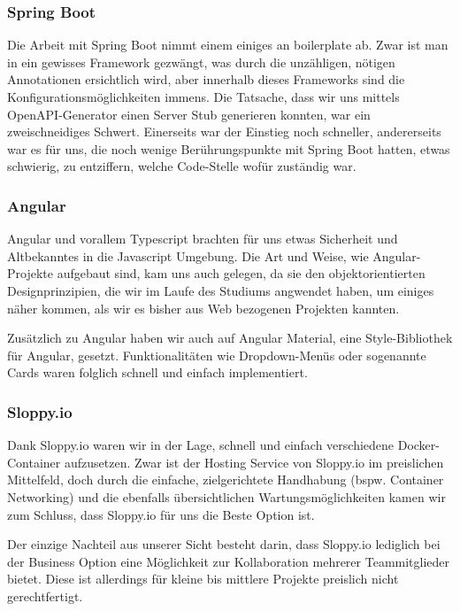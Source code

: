 \documentclass[../main.tex]{subfiles}
\begin{document}
	\subsubsection{Spring Boot}
	Die Arbeit mit Spring Boot nimmt einem einiges an \gls{boilerplate} ab. Zwar ist man in ein gewisses Framework gezwängt, was durch die unzähligen, nötigen Annotationen ersichtlich wird, aber innerhalb dieses Frameworks sind die Konfigurationsmöglichkeiten immens. Die Tatsache, dass wir uns mittels OpenAPI-Generator einen Server Stub generieren konnten, war ein zweischneidiges Schwert. Einerseits war der Einstieg noch schneller, andererseits war es für uns, die noch wenige Berührungspunkte mit Spring Boot hatten, etwas schwierig, zu entziffern, welche Code-Stelle wofür zuständig war.
	
	\subsubsection{Angular}
	Angular und vorallem Typescript brachten für uns etwas Sicherheit und Altbekanntes in die Javascript Umgebung. Die Art und Weise, wie Angular-Projekte aufgebaut sind, kam uns auch gelegen, da sie den objektorientierten Designprinzipien, die wir im Laufe des Studiums angwendet haben, um einiges näher kommen, als wir es bisher aus Web bezogenen Projekten kannten.
	
	\noindent Zusätzlich zu Angular haben wir auch auf Angular Material, eine Style-Bibliothek für Angular, gesetzt. Funktionalitäten wie Dropdown-Menüs oder sogenannte Cards waren folglich schnell und einfach implementiert.
	
	\subsubsection{Sloppy.io}
	Dank Sloppy.io waren wir in der Lage, schnell und einfach verschiedene Docker-Container aufzusetzen. Zwar ist der Hosting Service von Sloppy.io im preislichen Mittelfeld, doch durch die einfache, zielgerichtete Handhabung (bspw. Container Networking) und die ebenfalls übersichtlichen Wartungsmöglichkeiten kamen wir zum Schluss, dass Sloppy.io für uns die Beste Option ist.
	
	\noindent Der einzige Nachteil aus unserer Sicht besteht darin, dass Sloppy.io lediglich bei der Business Option eine Möglichkeit zur Kollaboration mehrerer Teammitglieder bietet. Diese ist allerdings für kleine bis mittlere Projekte preislich nicht gerechtfertigt.
	
\end{document}
